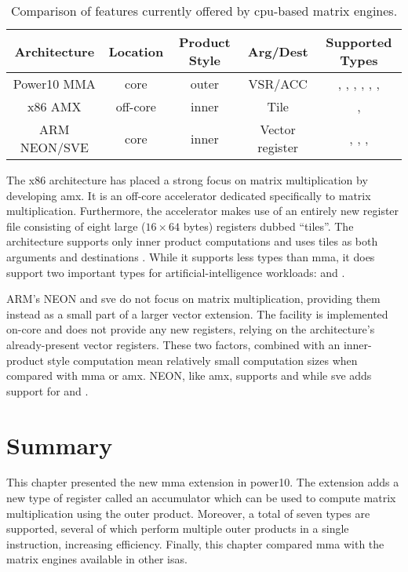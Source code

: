 \documentclass[\main/thesis.tex]{subfiles}
\begin{document}
\begin{table}
  \centering
  \begin{tabular}{| c | c | c | c | c |}
    \hline
    Architecture & Location & \parbox[t][28pt][t]{40pt}{\centering Product Style} & Arg/Dest & Supported Types\\\hline
    \parbox[t][][t]{40pt}{\centering Power10 MMA} & core & outer & VSR/ACC & \parbox[t][40pt][t]{3.2cm}{\raggedright{}, , , , , , }\\\hline
    x86 AMX & off-core & inner & Tile &\parbox[t][11pt][t]{3.3cm}{\raggedright{}, }\\\hline
    \parbox[t][][t]{60pt}{\centering ARM NEON/SVE} & core & inner & Vector register & \parbox[t][25pt][t]{3.3cm}{\raggedright{}, , , }\\\hline
  \end{tabular}
  \caption[Matrix Engine Feature Comparison]{Comparison of features currently offered by cpu-based matrix engines.}
  \label{tab:featComp}
\end{table}

The x86 architecture has placed a strong focus on matrix multiplication by developing \gls{amx}.
It is an off-core accelerator dedicated specifically to matrix multiplication.
Furthermore, the accelerator makes use of an entirely new register file consisting of eight large ($16 \times 64$ bytes) registers dubbed ``tiles''.
The architecture supports only inner product computations and uses tiles as both arguments and destinations .
While it supports less types than \gls{mma}, it does support two important types for artificial-intelligence workloads:  and .

ARM's NEON and \gls{sve} do not focus on matrix multiplication, providing them instead as a small part of a larger vector extension.
The facility is implemented on-core and does not provide any new registers, relying on the architecture's already-present vector registers.
These two factors, combined with an inner-product style computation mean relatively small computation sizes when compared with \gls{mma} or \gls{amx}.
NEON, like \gls{amx}, supports  and  while \gls{sve} adds support for  and .

\section{Summary}
This chapter presented the new \gls{mma} extension in \gls{power10}.
The extension adds a new type of register called an accumulator which can be used to compute matrix multiplication using the outer product.
Moreover, a total of seven types are supported, several of which perform multiple outer products in a single instruction, increasing efficiency.
Finally, this chapter compared \gls{mma} with the \glspl{matrix engine} available in other \glspl{isa}.
\end{document}

